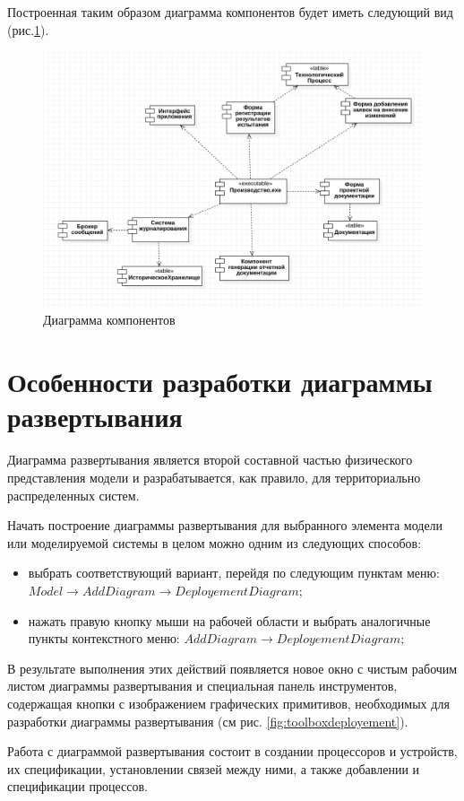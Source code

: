\documentclass[a4paper,12pt]{report}
\begin{document}
Построенная таким образом диаграмма компонентов будет иметь следующий вид (рис.\ref{fig:componentsfull}).
\begin{figure}[h!]
	\centering
	\includegraphics[width=0.7\linewidth]{images/componentsfull}
	\caption{Диаграмма компонентов}
	\label{fig:componentsfull}
\end{figure}

\section{Особенности разработки диаграммы развертывания}
Диаграмма развертывания является второй составной частью физического представления модели и разрабатывается, как правило, для территориально распределенных систем. 

Начать построение диаграммы развертывания для выбранного элемента модели или моделируемой системы в целом можно одним из следующих способов:
\begin{itemize}
	\item выбрать соответствующий вариант, перейдя по следующим пунктам меню: \\$Model \to Add Diagram \to Deployement Diagram$;
	\item нажать правую кнопку мыши на рабочей области и выбрать аналогичные пункты контекстного меню: $Add Diagram \to Deployement Diagram$;
\end{itemize}

В результате выполнения этих действий появляется новое окно с чистым рабочим листом диаграммы развертывания и специальная панель инструментов, содержащая кнопки с изображением графических примитивов, необходимых для разработки диаграммы развертывания (см рис. \ref{fig:toolboxdeployement}).

Работа с диаграммой развертывания состоит в создании процессоров и устройств, их спецификации, установлении связей между ними, а также добавлении и спецификации процессов.
\end{document}
